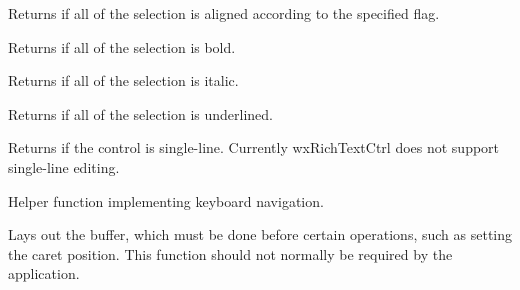 \label{wxrichtextctrlisselectionaligned}


Returns \true if all of the selection is aligned according to the specified flag.

\label{wxrichtextctrlisselectionbold}


Returns \true if all of the selection is bold.

\label{wxrichtextctrlisselectionitalics}


Returns \true if all of the selection is italic.

\label{wxrichtextctrlisselectionunderlined}


Returns \true if all of the selection is underlined.

\label{wxrichtextctrlissingleline}


Returns \true if the control is single-line. Currently wxRichTextCtrl does not
support single-line editing.

\label{wxrichtextctrlkeyboardnavigate}


Helper function implementing keyboard navigation.

\label{wxrichtextctrllayoutcontent}


Lays out the buffer, which must be done before certain operations, such as
setting the caret position. This function should not normally be required by the
application.

\label{wxrichtextctrllinebreak}


